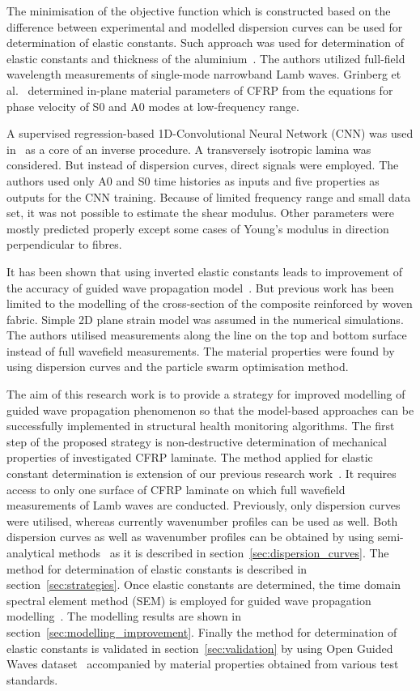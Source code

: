 \documentclass[preprint,12pt]{elsarticle}
\begin{document}
The minimisation of the objective function which is constructed based on the difference between experimental and modelled dispersion curves can be used for determination of elastic constants.
Such approach was used for determination of elastic constants and thickness of the aluminium~\cite{Dean2008}.
The authors utilized full-field wavelength measurements of single-mode narrowband Lamb waves. Grinberg et al.~\cite{Grimberg2010} determined in-plane material parameters of CFRP from the equations for phase velocity of S0 and A0 modes at low-frequency range.

A supervised regression-based 1D-Convolutional Neural Network (CNN) was used in~\cite{Rautela2020} as a core of an inverse procedure.
A transversely isotropic lamina was considered. 
But instead of dispersion curves, direct signals were employed.
The authors used only A0 and S0 time histories as inputs and five properties as outputs for the CNN training.
Because of limited frequency range and small data set, it was not possible to estimate the shear modulus. 
Other parameters were mostly predicted properly except some cases of Young's modulus in direction perpendicular to fibres.

It has been shown that using inverted elastic constants leads to improvement of the accuracy of guided wave propagation model~\cite{Ong2016}.
But previous work has been limited to the modelling of the cross-section of the composite reinforced by woven fabric.
Simple 2D plane strain model was assumed in the numerical simulations.
The authors utilised measurements along the line on the top and bottom surface instead of full wavefield measurements.
The material properties were found by using dispersion curves and the particle swarm optimisation method.

The aim of this research work is to provide a strategy for improved modelling of guided wave propagation phenomenon so that the model-based approaches can be successfully implemented in structural health monitoring algorithms.
The first step of the proposed strategy is non-destructive determination of mechanical properties of investigated CFRP laminate.
The method applied for elastic constant determination is extension of our previous research work~\cite{Kudela2020}.	
It requires access to only one surface of CFRP laminate on which full wavefield measurements of Lamb waves are conducted.
Previously, only dispersion curves were utilised, whereas currently wavenumber profiles can be used as well.
Both dispersion curves as well as wavenumber profiles can be obtained by using semi-analytical methods~\cite{Bartoli2006,Marzani2008} as it is described in section~\ref{sec:dispersion_curves}.
The method for determination of elastic constants is described in section~\ref{sec:strategies}.
Once elastic constants are determined, the time domain spectral element method (SEM) is employed for guided wave propagation modelling~\cite{Kudela2020a}.
The modelling results are shown in section~\ref{sec:modelling_improvement}.
Finally the method for determination of elastic constants is validated in section~\ref{sec:validation} by using Open Guided Waves dataset~\cite{Moll2019} accompanied by material properties obtained from various test standards.
	
\end{document}
